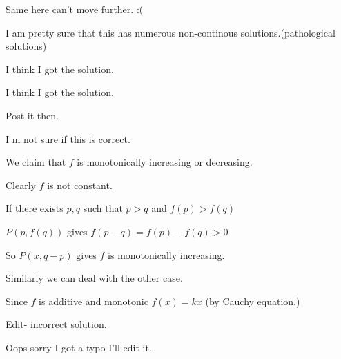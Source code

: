 \begin{solution}
	Same here can't move further. :(
\end{solution}



\begin{solution}
	I am pretty sure that this has numerous non-continous solutions.(pathological solutions)
\end{solution}



\begin{solution}
	I think I got the solution.
\end{solution}



\begin{solution}
	\begin{tcolorbox}I think I got the solution.\end{tcolorbox}

Post it then.
\end{solution}



\begin{solution}
	I m not sure if this is correct.

We claim that $f$ is monotonically increasing or decreasing.

Clearly $f$ is not constant. 

If there exists $p,q$ such that $p>q$ and $f(p)>f(q)$

$P(p,f(q))$ gives $f(p-q) = f(p)-f(q)>0$

So $P(x, q-p)$ gives $f$ is monotonically increasing.

Similarly we can deal with the other case.

Since $f$ is additive and monotonic $f(x)=kx$ (by Cauchy equation.)

Edit- incorrect solution.
\end{solution}



\begin{solution}
	Oops sorry I got a typo I'll edit it.
\end{solution}



